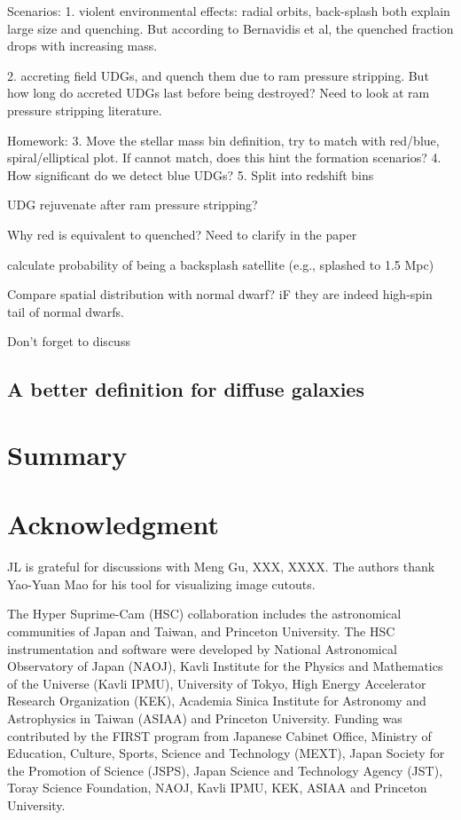 \documentclass[twocolumn,astrosymb,twocolappendix]{aastex631}
\begin{document}
\begin{CJK*}{UTF8}{gbsn}
Scenarios:
1. violent environmental effects: radial orbits, back-splash both explain large size and quenching. But according to Bernavidis et al, the quenched fraction drops with increasing mass. 

2. accreting field UDGs, and quench them due to ram pressure stripping. But how long do accreted UDGs last before being destroyed? Need to look at ram pressure stripping literature.

Homework:
3. Move the stellar mass bin definition, try to match with red/blue, spiral/elliptical plot. If cannot match, does this hint the formation scenarios?
4. How significant do we detect blue UDGs? 
5. Split into redshift bins


UDG rejuvenate after ram pressure stripping?

Why red is equivalent to quenched? Need to clarify in the paper

calculate probability of being a backsplash satellite (e.g., splashed to 1.5 Mpc)

Compare spatial distribution with normal dwarf? iF they are indeed high-spin tail of normal dwarfs. 

Don't forget to discuss \citep{xSAGA-I}


\subsection{A better definition for diffuse galaxies}





\section{Summary}


\section*{Acknowledgment}
JL is grateful for discussions with Meng Gu, XXX, XXXX. The authors thank Yao-Yuan Mao for his tool for visualizing image cutouts. 

The Hyper Suprime-Cam (HSC) collaboration includes the astronomical communities of Japan and Taiwan, and Princeton University. The HSC instrumentation and software were developed by National Astronomical Observatory of Japan (NAOJ), Kavli Institute for the Physics and Mathematics of the Universe (Kavli IPMU), University of Tokyo, High Energy Accelerator Research Organization (KEK), Academia Sinica Institute for Astronomy and Astrophysics in Taiwan (ASIAA) and Princeton University.  
Funding was contributed by the FIRST program from Japanese Cabinet Office, Ministry of Education, Culture, Sports, Science and Technology (MEXT), Japan Society for the Promotion of Science (JSPS), Japan Science and Technology Agency (JST), Toray Science Foundation, NAOJ, Kavli IPMU, KEK, ASIAA and Princeton University.


\end{CJK*}
\end{document}
